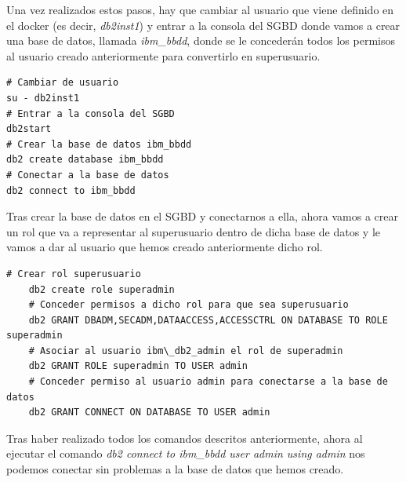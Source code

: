 \documentclass{article}
\begin{document}
Una vez realizados estos pasos, hay que cambiar al usuario que viene definido en el docker (es decir, \textit{db2inst1}) y entrar a la consola del SGBD donde vamos a crear una base de datos, llamada \textit{ibm\_bbdd}, donde se le concederán todos los permisos al usuario creado anteriormente para convertirlo en superusuario.
\begin{lstlisting}[style=bashStyle]
# Cambiar de usuario
su - db2inst1
# Entrar a la consola del SGBD
db2start
# Crear la base de datos ibm_bbdd
db2 create database ibm_bbdd
# Conectar a la base de datos
db2 connect to ibm_bbdd
\end{lstlisting}
Tras crear la base de datos en el SGBD y conectarnos a ella, ahora vamos a crear un rol que va a representar al superusuario dentro de dicha base de datos y le vamos a dar al usuario que hemos creado anteriormente dicho rol.
\begin{lstlisting}[style=bashStyle]
    # Crear rol superusuario
    db2 create role superadmin
    # Conceder permisos a dicho rol para que sea superusuario
    db2 GRANT DBADM,SECADM,DATAACCESS,ACCESSCTRL ON DATABASE TO ROLE superadmin
    # Asociar al usuario ibm\_db2_admin el rol de superadmin
    db2 GRANT ROLE superadmin TO USER admin
    # Conceder permiso al usuario admin para conectarse a la base de datos
    db2 GRANT CONNECT ON DATABASE TO USER admin
\end{lstlisting}
Tras haber realizado todos los comandos descritos anteriormente, ahora al ejecutar el comando \textit{db2 connect to ibm\_bbdd user admin using admin} nos podemos conectar sin problemas a la base de datos que hemos creado.
\end{document}
